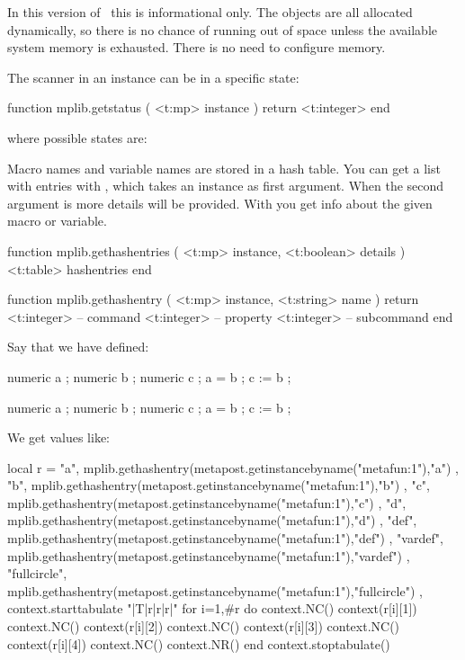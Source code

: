 In this version of \MPLIB\ this is informational only. The objects are all
allocated dynamically, so there is no chance of running out of space unless the
available system memory is exhausted. There is no need to configure memory.

The scanner in an instance can be in a specific state:

\starttyping[option=LUA]
function mplib.getstatus ( <t:mp> instance )
    return <t:integer>
end
\stoptyping

where possible states are:

\startcolumns[n=4]
\stopcolumns

Macro names and variable names are stored in a hash table. You can get a list
with entries with , which takes an instance as first
argument. When the second argument is  more details will be provided.
With  you get info about the given macro or variable.

\starttyping[option=LUA]
function mplib.gethashentries ( <t:mp> instance, <t:boolean> details )
    <t:table> hashentries
end
\stoptyping

\starttyping[option=LUA]
function mplib.gethashentry ( <t:mp> instance, <t:string> name )
    return
        <t:integer> -- command
        <t:integer> -- property
        <t:integer> -- subcommand
end
\stoptyping

Say that we have defined:

\starttyping[option=MP]
numeric a ; numeric b ; numeric c ; a = b ; c := b ;
\stoptyping

\startMPcalculation
    numeric a ; numeric b ; numeric c ; a = b ; c := b ;
\stopMPcalculation

We get values like:

\startluacode
local r = {
    { "a",          mplib.gethashentry(metapost.getinstancebyname("metafun:1"),"a") },
    { "b",          mplib.gethashentry(metapost.getinstancebyname("metafun:1"),"b") },
    { "c",          mplib.gethashentry(metapost.getinstancebyname("metafun:1"),"c") },
    { "d",          mplib.gethashentry(metapost.getinstancebyname("metafun:1"),"d") },
    { "def",        mplib.gethashentry(metapost.getinstancebyname("metafun:1"),"def") },
    { "vardef",     mplib.gethashentry(metapost.getinstancebyname("metafun:1"),"vardef") },
    { "fullcircle", mplib.gethashentry(metapost.getinstancebyname("metafun:1"),"fullcircle") },
}
context.starttabulate { "|T|r|r|r|" }
for i=1,#r do
    context.NC() context(r[i][1])
    context.NC() context(r[i][2])
    context.NC() context(r[i][3])
    context.NC() context(r[i][4])
    context.NC() context.NR()
end
context.stoptabulate()
\stopluacode

